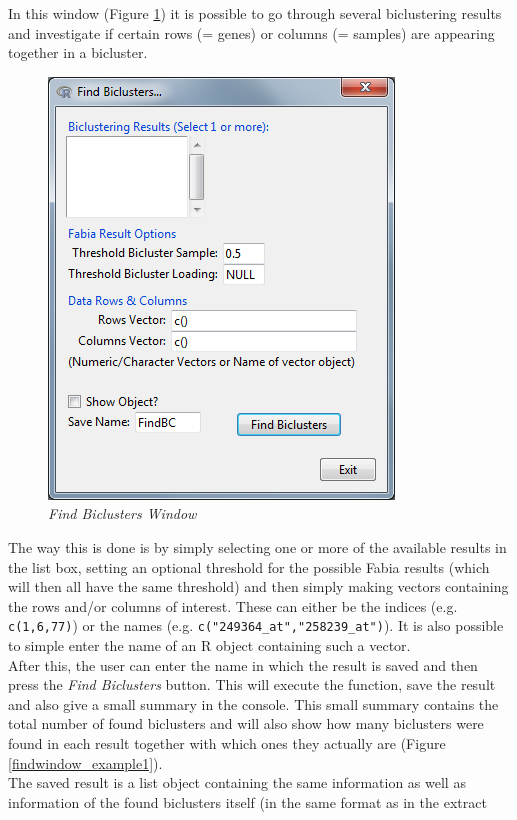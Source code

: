 \documentclass[a4paper]{article}\usepackage[]{graphicx}\usepackage[]{color}
\begin{document}
\noindent In this window (Figure \ref{findwindow}) it is possible to go through several
biclustering results and investigate if certain rows (= genes) or columns (= samples) are
appearing together in a bicluster. 
\begin{figure}[H]
\centering
\includegraphics[scale=0.5]{figures/findwindow.png}
\caption{{\it Find Biclusters Window}\label{findwindow}}
\end{figure}
\noindent The way this is done is by simply selecting
one or more of the available results in the list box, setting an optional
threshold for the possible Fabia results (which will then all have the same
threshold) and then simply making vectors containing the rows and/or columns of interest. These
can either be the indices (e.g. \verb|c(1,6,77)|) or the names (e.g.
\verb|c("249364_at","258239_at")|). It is also possible to simple enter the name
of an R object containing such a vector.\\
After this, the user can enter the name in which the result is saved and then
press the {\it Find Biclusters} button. This will execute the function, save the
result and also give a small summary in the console. This small summary contains
the total number of found biclusters and will also show how many biclusters were
found in each result together with which ones they actually are (Figure
\ref{findwindow_example1}).
\\
The saved result is a list object containing the same information as well as
information of the found biclusters itself (in the same format as in the extract
\end{document}
